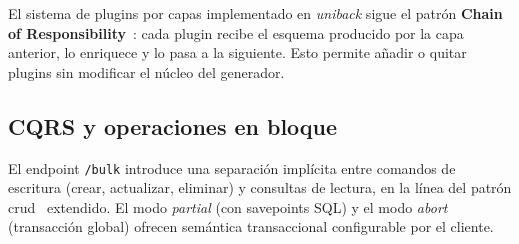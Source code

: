 El sistema de plugins por capas implementado en \textit{uniback} sigue el patrón
\textbf{Chain of Responsibility}~\cite{gof}: cada plugin recibe el esquema producido por
la capa anterior, lo enriquece y lo pasa a la siguiente. Esto permite añadir o quitar
plugins sin modificar el núcleo del generador.

\subsection{CQRS y operaciones en bloque}
\label{subsec:cqrs}

El endpoint \texttt{/bulk} introduce una separación implícita entre comandos de escritura
(crear, actualizar, eliminar) y consultas de lectura, en la línea del patrón
\gls{crud}~\cite{fowler2002} extendido. El modo \textit{partial} (con savepoints SQL) y
el modo \textit{abort} (transacción global) ofrecen semántica transaccional configurable
por el cliente.
